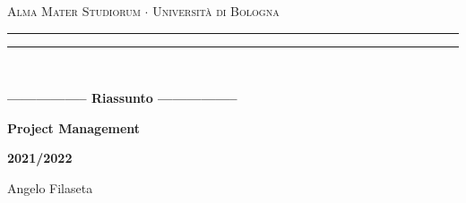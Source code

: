 \begin{titlepage}
    \begin{center}
        {{\Large{\textsc{Alma Mater Studiorum $\cdot$ Università di Bologna}}}}
        \rule[0.1cm]{15.8cm}{0.1mm}
        \rule[0.5cm]{15.8cm}{0.6mm}
        \\
        \vspace{3mm}
    \end{center}
    \vspace{2mm}
    \begin{center}
        {\LARGE{\bf{----------------- Riassunto -----------------}}}
        \vspace{5mm} \par \noindent
        {\Huge{\bf{Project Management}}}
        \vspace{10mm} \par \noindent
        {\LARGE \textbf{2021/2022}}
        \vspace{15mm} \par \noindent
        {\Large Angelo Filaseta}
    \end{center}
    \hfill
    \vspace{40mm}
\end{titlepage}
